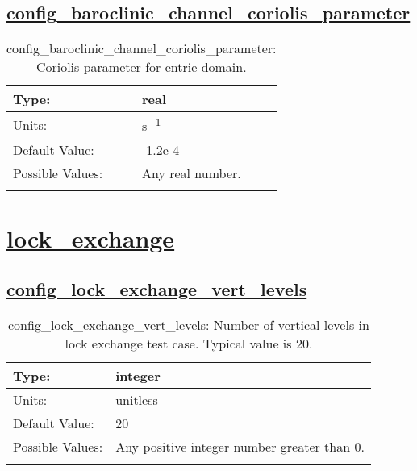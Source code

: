 \subsection[config\_baroclinic\_channel\_coriolis\_parameter]{\hyperref[sec:nm_tab_baroclinic_channel]{config\_baroclinic\_channel\_coriolis\_parameter}}
\label{subsec:nm_sec_config_baroclinic_channel_coriolis_parameter}
\begin{center}
\begin{longtable}{| p{2.0in} || p{4.0in} |}
    \hline
    Type: & real \\
    \hline
    Units: & \si{s^{-1}} \\
    \hline
    Default Value: & -1.2e-4 \\
    \hline
    Possible Values: & Any real number. \\
    \hline
    \caption{config\_baroclinic\_channel\_coriolis\_parameter: Coriolis parameter for entrie domain.}
\end{longtable}
\end{center}
\section[lock\_exchange]{\hyperref[sec:nm_tab_lock_exchange]{lock\_exchange}}
\label{sec:nm_sec_lock_exchange}
\subsection[config\_lock\_exchange\_vert\_levels]{\hyperref[sec:nm_tab_lock_exchange]{config\_lock\_exchange\_vert\_levels}}
\label{subsec:nm_sec_config_lock_exchange_vert_levels}
\begin{center}
\begin{longtable}{| p{2.0in} || p{4.0in} |}
    \hline
    Type: & integer \\
    \hline
    Units: & \si{unitless} \\
    \hline
    Default Value: & 20 \\
    \hline
    Possible Values: & Any positive integer number greater than 0. \\
    \hline
    \caption{config\_lock\_exchange\_vert\_levels: Number of vertical levels in lock exchange test case. Typical value is 20.}
\end{longtable}
\end{center}

